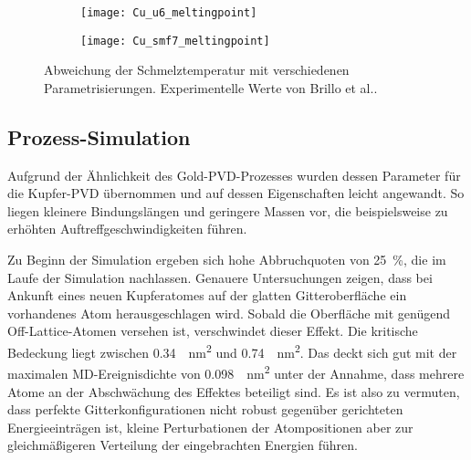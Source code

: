 \begin{figure}[tbp]
  \centering
  \captionsetup[subfigure]{singlelinecheck=false}
  \def\subfigwidth{7cm}
  \begin{subfigure}[t]{\subfigwidth}
    \texttt{[image: Cu\_u6\_meltingpoint]}
  \end{subfigure}
  \hfill
  \begin{subfigure}[t]{\subfigwidth}
    \texttt{[image: Cu\_smf7\_meltingpoint]}
  \end{subfigure}
  \caption[Abweichung der Schmelztemperaturen bei Kupfer-MD]{
    Abweichung der Schmelztemperatur mit verschiedenen Parametrisierungen.
    Experimentelle Werte von Brillo et al.\cite{brillo_density_2006}.
  }
  \label{fig:copperthermo}
\end{figure}

\subsection{Prozess-Simulation}

Aufgrund der Ähnlichkeit des Gold-PVD-Prozesses wurden dessen Parameter für die Kupfer-PVD übernommen und auf dessen Eigenschaften leicht angewandt.
So liegen kleinere Bindungslängen und geringere Massen vor, die beispielsweise zu erhöhten Auftreffgeschwindigkeiten führen.

Zu Beginn der Simulation ergeben sich hohe Abbruchquoten von \SI{25}{\percent}, die im Laufe der Simulation nachlassen.
Genauere Untersuchungen zeigen, dass bei Ankunft eines neuen Kupferatomes auf der glatten Gitteroberfläche ein vorhandenes Atom herausgeschlagen wird.
Sobald die Oberfläche mit genügend Off-Lattice-Atomen versehen ist, verschwindet dieser Effekt.
Die kritische Bedeckung liegt zwischen \SI{0.34}{\per\nano\meter\squared} und \SI{0.74}{\per\nano\meter\squared}.
Das deckt sich gut mit der maximalen MD-Ereignisdichte von \SI{0.098}{\per\nano\meter\squared} unter der Annahme, dass mehrere Atome an der Abschwächung des Effektes beteiligt sind.
Es ist also zu vermuten, dass perfekte Gitterkonfigurationen nicht robust gegenüber gerichteten Energieeinträgen ist, kleine Perturbationen der Atompositionen aber zur gleichmäßigeren Verteilung der eingebrachten Energien führen.

